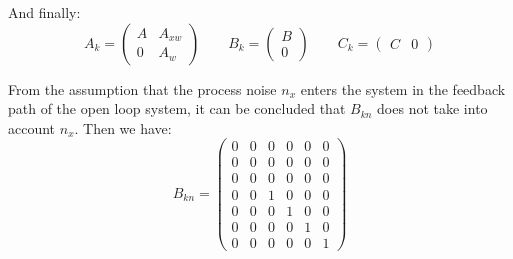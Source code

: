And finally:
\begin{equation*}
  A_k = \begin{pmatrix}
   A & A_{xw}\\
   0 & A_w
\end{pmatrix}
\qquad B_{k} = \begin{pmatrix}
	B\\
	0
\end{pmatrix}
\qquad C_{k} = \begin{pmatrix}
	C & 0
\end{pmatrix}
\end{equation*}

From the assumption that the process noise $n_x$ enters the system in the feedback path of the open loop system, it can be concluded that $B_{kn}$ does not take into account $n_x$. Then we have:
\begin{equation*}
B_{kn} = \begin{pmatrix}
	0 & 0 & 0 & 0 & 0 & 0\\
	0 & 0 & 0 & 0 & 0 & 0\\
	0 & 0 & 0 & 0 & 0 & 0\\
	0 & 0 & 1 & 0 & 0 & 0\\
	0 & 0 & 0 & 1 & 0 & 0\\
	0 & 0 & 0 & 0 & 1 & 0\\
	0 & 0 & 0 & 0 & 0 & 1
\end{pmatrix}
\end{equation*}
